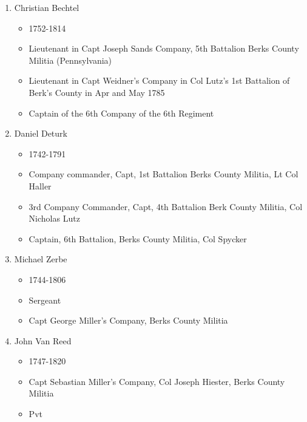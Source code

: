 \documentclass[11pt,letter]{book}
\begin{document}
\begin{enumerate}
\item Christian Bechtel
\begin{itemize}
\item 1752-1814
\item Lieutenant in Capt Joseph Sands Company, 5th Battalion Berks County Militia (Pennsylvania) 
\item Lieutenant in Capt Weidner's Company in Col Lutz's 1st Battalion of Berk's County in Apr and May 1785 
\item Captain of the 6th Company of the 6th Regiment 
\end{itemize}

\item Daniel Deturk
\begin{itemize}
\item 1742-1791
\item Company commander, Capt, 1st Battalion Berks County Militia, Lt Col Haller 
\item 3rd Company Commander, Capt, 4th Battalion Berk County Militia, Col Nicholas Lutz 
\item Captain, 6th Battalion, Berks County Militia, Col Spycker 
\end{itemize}

\item Michael Zerbe
\begin{itemize}
\item 1744-1806
\item Sergeant
\item Capt George Miller's Company, Berks County Militia 
\end{itemize}

\item John Van Reed
\begin{itemize}
\item 1747-1820
\item Capt Sebastian Miller's Company, Col Joseph Hiester, Berks County Militia 
\item Pvt
\end{itemize}


\end{enumerate}
\end{document}
